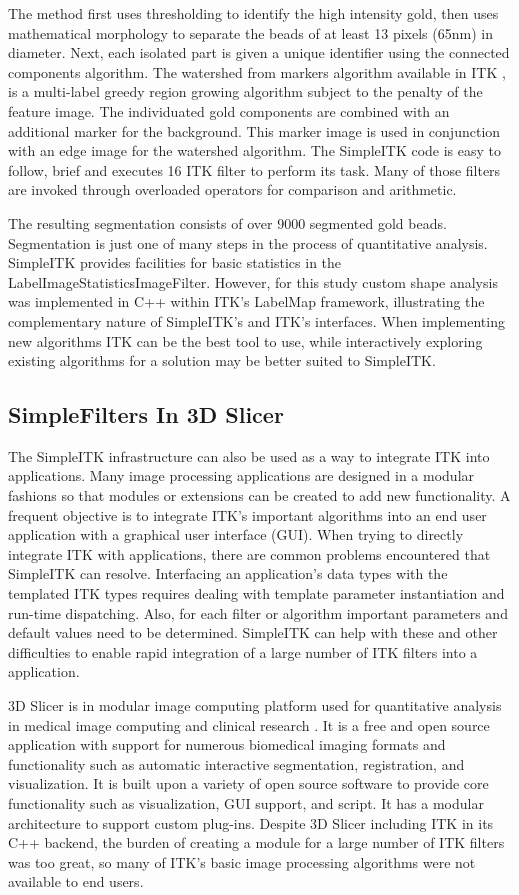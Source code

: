\documentclass{frontiersMED} %
\begin{document}
The method first uses thresholding to identify the high intensity gold,
then uses mathematical morphology to separate the beads of at least 13 pixels
(65nm) in diameter. Next, each isolated part is given a unique
identifier using the connected components algorithm. The watershed from
markers algorithm available in ITK \cite{Beare2006}, is
a multi-label greedy region growing algorithm subject to the penalty of the
feature image. The individuated gold components are combined with an
additional marker for the background. This marker image is used in
conjunction with an edge image for the watershed algorithm. The
SimpleITK code is easy to follow, brief and executes 16 ITK filter
to perform its task. Many of those filters are invoked through
overloaded operators for comparison and arithmetic.

The resulting segmentation consists of over 9000 segmented gold
beads. Segmentation is just one of many steps in the process of
quantitative analysis. SimpleITK provides facilities for basic
statistics in the LabelImageStatisticsImageFilter. However, for this
study custom shape analysis was implemented in C++
within ITK's LabelMap framework, illustrating the complementary
nature of SimpleITK's and ITK's interfaces. When implementing new
algorithms ITK can be the best tool to use, while interactively
exploring existing algorithms for a solution may be better suited to
SimpleITK.

\subsection{SimpleFilters In 3D Slicer}
The SimpleITK infrastructure can also be used as a way to integrate
ITK into applications. Many image processing applications are designed
in a modular fashions so that modules or extensions can be created to
add new functionality. A frequent objective is to integrate ITK's
important algorithms into an end user application with a graphical
user interface (GUI). When trying to directly integrate ITK with
applications, there are common problems encountered that SimpleITK can
resolve. Interfacing an application's data types with
the templated ITK types requires dealing with template parameter
instantiation and run-time dispatching. Also, for each filter or algorithm
important parameters and default values need to be
determined. SimpleITK can help with these and other difficulties to
enable rapid integration of a large number of ITK filters into a
application.

3D Slicer is in modular image computing platform used for quantitative
analysis in medical image computing and clinical research
\cite{Fedorov2012}. It is a free and open source application with support
for numerous biomedical imaging formats and functionality such as
automatic interactive segmentation, registration, and
visualization. It is built upon a variety of open source software
to provide core functionality such as visualization, GUI
support, and script. It has a modular
architecture to support custom plug-ins. Despite 3D Slicer including ITK
in its C++ backend, the burden of creating a module for a large number of ITK
filters was too great, so many of ITK's basic image processing algorithms
were not available to end users.
\end{document}

